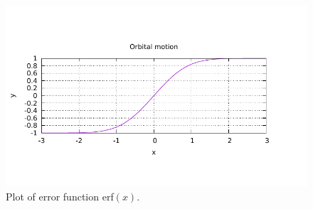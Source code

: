 \documentclass[a4paper,oneside,11pt,article]{memoir}
\begin{document}
\begin{figure}
\centering
\includegraphics[width=1\linewidth]{plot}
\caption{Plot of error function erf$(x)$.}
\label{fig:plot}
\end{figure}
\end{document}

